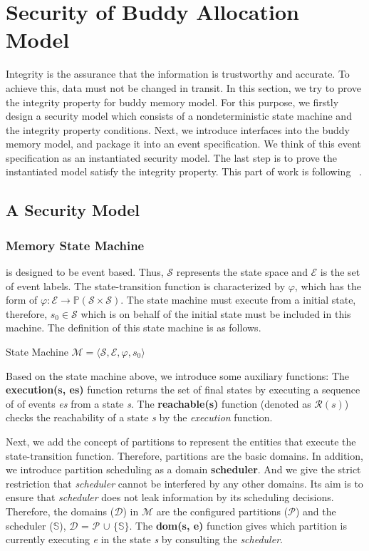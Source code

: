 \documentclass[runningheads]{llncs}
\begin{document}
\section{Security of Buddy Allocation Model}
Integrity is the assurance that the information is trustworthy and accurate. To achieve this, data must not be changed in transit. In this section, we try to prove the integrity property for buddy memory model. For this purpose, we firstly design a security model which consists of a nondeterministic state machine and the integrity property conditions. Next, we introduce interfaces into the buddy memory model, and package it into an event specification. We think of this event specification as an instantiated security model. The last step is to prove the instantiated model satisfy the integrity property.  This part of work is following ~\cite{reg_securitymodel}.

\subsection{A Security Model}

\subsubsection{Memory State Machine} is designed to be event based. Thus, $\mathcal{S}$ represents the state space and $\mathcal{E}$ is the set of event labels. The state-transition function is characterized by $\varphi$, which has the form of $\varphi: \mathcal{E} \rightarrow \mathbb{P}(\mathcal{S} \times \mathcal{S})$. The state machine must execute from a initial state, therefore, $s_0 \in \mathcal{S}$ which is on behalf of the initial state must be included in this machine. The definition of this state machine is as follows.

\begin{definition} {State Machine} $\mathcal{M} = \langle \mathcal{S}, \mathcal{E}, \varphi, s_0 \rangle$
\end{definition}

Based on the state machine above, we introduce some auxiliary functions: The \textbf{execution(s, es)} function returns the set of final states by executing a sequence of of events \emph{es} from a state \emph{s}. The \textbf{reachable(s)} function (denoted as $\mathcal{R}(s)$) checks the reachability of a state \emph{s} by the \emph{execution} function.

Next, we add the concept of partitions to represent the entities that execute the state-transition function. Therefore, partitions are the basic domains. In addition, we introduce partition scheduling as a domain \textbf{scheduler}. And we give the strict restriction that \emph{scheduler} cannot be interfered by any other domains. Its aim is to ensure that \emph{scheduler} does not leak information by its scheduling decisions. Therefore, the domains ($\mathcal{D}$) in $\mathcal{M}$ are the configured partitions ($\mathcal{P}$) and the scheduler ($\mathbb{S}$), $\mathcal{D}$ = $\mathcal{P}$ $\cup$ $\lbrace$$\mathbb{S}$$\rbrace$. The \textbf{dom(s, e)} function gives which partition is currently executing \emph{e} in the state \emph{s} by consulting the \emph{scheduler}.
\end{document}
